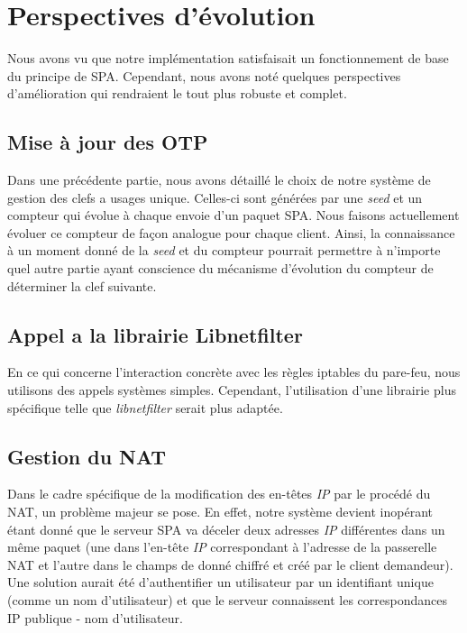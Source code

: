 \chapter{Perspectives d'évolution}

Nous avons vu que notre implémentation satisfaisait un fonctionnement de base du principe de SPA.
Cependant, nous avons noté quelques perspectives d'amélioration qui rendraient le tout plus robuste et complet.

\section{Mise à jour des OTP}
Dans une précédente partie, nous avons détaillé le choix de notre système de gestion des clefs a usages unique. 
Celles-ci sont générées par une \emph{seed} et un compteur qui évolue à chaque envoie d'un paquet SPA.
Nous faisons actuellement évoluer ce compteur de façon analogue pour chaque client.
Ainsi, la connaissance à un moment donné de la \emph{seed} et du compteur pourrait permettre à n'importe quel autre partie ayant conscience du mécanisme d'évolution du compteur de déterminer la clef suivante.

\section{Appel a la librairie Libnetfilter}
En ce qui concerne l'interaction concrète avec les règles iptables du pare-feu, nous utilisons des appels systèmes simples. Cependant, l'utilisation d'une librairie plus spécifique telle que \emph{libnetfilter} serait plus adaptée.

\section{Gestion du NAT}
Dans le cadre spécifique de la modification des en-têtes \emph{IP} par le procédé du NAT, un problème majeur se pose.
En effet, notre système devient inopérant étant donné que le serveur SPA va déceler deux adresses \emph{IP} différentes dans un même paquet (une dans l'en-tête \emph{IP} correspondant à l'adresse de la passerelle NAT et l'autre dans le champs de donné chiffré et créé par le client demandeur).
Une solution aurait été d'authentifier un utilisateur par un identifiant unique (comme un nom d'utilisateur) et que le serveur connaissent les correspondances IP publique - nom d'utilisateur.
